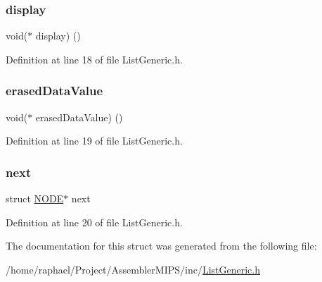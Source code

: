 \subsubsection{\texorpdfstring{display}{display}}
{\footnotesize\ttfamily void($\ast$ display) ()}



Definition at line 18 of file List\+Generic.\+h.

\mbox{\label{struct_n_o_d_e_af74860f29ae9aa4b463e2378bcd7a298}} 
\subsubsection{\texorpdfstring{erased\+Data\+Value}{erasedDataValue}}
{\footnotesize\ttfamily void($\ast$ erased\+Data\+Value) ()}



Definition at line 19 of file List\+Generic.\+h.

\mbox{\label{struct_n_o_d_e_aab1da0ec3c3507ad0a648c72f34b3267}} 
\subsubsection{\texorpdfstring{next}{next}}
{\footnotesize\ttfamily struct \mbox{\hyperlink{struct_n_o_d_e}{N\+O\+DE}}$\ast$ next}



Definition at line 20 of file List\+Generic.\+h.



The documentation for this struct was generated from the following file\+:\begin{DoxyCompactItemize}
\item 
/home/raphael/\+Project/\+Assembler\+M\+I\+P\+S/inc/\mbox{\hyperlink{_list_generic_8h}{List\+Generic.\+h}}\end{DoxyCompactItemize}
